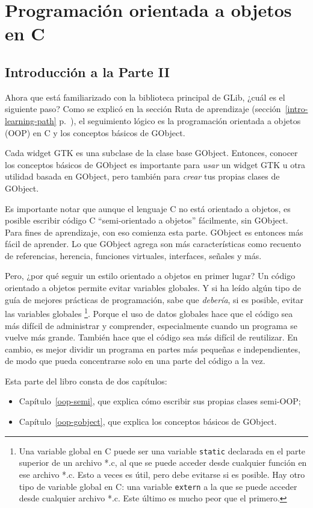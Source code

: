 \part{Programación orientada a objetos en C\label{oop}}

\chapter*{Introducción a la Parte II}
\setcounter{footnote}{0}

Ahora que está familiarizado con la biblioteca principal de GLib, ¿cuál es el siguiente paso? Como se explicó en la sección Ruta de aprendizaje (sección~\ref{intro-learning-path} p.~\pageref{intro-learning-path}), el seguimiento lógico es la programación orientada a objetos (OOP) en C y los conceptos básicos de GObject.

Cada widget GTK es una subclase de la clase base GObject. Entonces, conocer los conceptos básicos de GObject es importante para \emph{usar} un widget GTK u otra utilidad basada en GObject, pero también para \emph{crear} tus propias clases de GObject.

Es importante notar que aunque el lenguaje C no está orientado a objetos, es posible escribir código C ``semi-orientado a objetos'' fácilmente, sin GObject. Para fines de aprendizaje, con eso comienza esta parte. GObject es entonces más fácil de aprender. Lo que GObject agrega son más características como recuento de referencias, herencia, funciones virtuales, interfaces, señales y más.

Pero, ¿por qué seguir un estilo orientado a objetos en primer lugar? Un código orientado a objetos permite evitar variables globales. Y si ha leído algún tipo de guía de mejores prácticas de programación, sabe que \emph{debería}, si es posible, evitar las variables globales \footnote{Una variable global en C puede ser una variable \lstinline{static} declarada en el parte superior de un archivo *.c, al que se puede acceder desde cualquier función en ese archivo *.c. Esto a veces es útil, pero debe evitarse si es posible. Hay otro tipo de variable global en C: una variable \lstinline{extern} a la que se puede acceder desde cualquier archivo *.c. Este último es mucho peor que el primero.}. Porque el uso de datos globales hace que el código sea más difícil de administrar y comprender, especialmente cuando un programa se vuelve más grande. También hace que el código sea más difícil de reutilizar. En cambio, es mejor dividir un programa en partes más pequeñas e independientes, de modo que pueda concentrarse solo en una parte del código a la vez.

Esta parte del libro consta de dos capítulos:
\begin{itemize}
    \item Capítulo~\ref{oop-semi}, que explica cómo escribir sus propias clases semi-OOP;
    \item Capítulo~\ref{oop-gobject}, que explica los conceptos básicos de GObject.
\end{itemize}